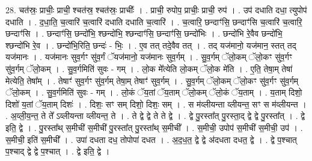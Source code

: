 \documentclass[17pt]{extarticle}
\begin{document}
28. चत॑स्रः॒ प्राचीः॒ प्राची॒ श्चत॑स्र॒ श्चत॑स्रः॒ प्राचीः᳚ । . प्राची॒ रुपोप॒ प्राचीः॒ प्राची॒ रुप॑ । . उप॑ दधाति दधा॒ त्युपोप॑ दधाति । . द॒धा॒ति॒ च॒त्वारि॑ च॒त्वारि॑ दधाति दधाति च॒त्वारि॑ । . च॒त्वारि॒ छन्दाꣳ॑सि॒ छन्दाꣳ॑सि च॒त्वारि॑ च॒त्वारि॒ छन्दाꣳ॑सि । . छन्दाꣳ॑सि॒ छन्दो॑भि॒ श्छन्दो॑भि॒ श्छन्दाꣳ॑सि॒ छन्दाꣳ॑सि॒ छन्दो॑भिः । . छन्दो॑भि रे॒वैव छन्दो॑भि॒ श्छन्दो॑भि रे॒व । . छन्दो॑भि॒रिति॒ छन्दः॑ - भिः॒ । . ए॒व तत् तदे॒वैव तत् । . तद् यज॑मानो॒ यज॑मान॒ स्तत् तद् यज॑मानः । . यज॑मानः सुव॒र्गꣳ सु॑व॒र्गं ॅयज॑मानो॒ यज॑मानः सुव॒र्गम् । . सु॒व॒र्गम् ॅलो॒कम् ॅलो॒कꣳ सु॑व॒र्गꣳ सु॑व॒र्गम् ॅलो॒कम् । . सु॒व॒र्गमिति॑ सुवः - गम् । . लो॒क मे᳚त्येति लो॒कम् ॅलो॒क मे॑ति । . ए॒ति॒ तेषा॒म् तेषा॑ मेत्येति॒ तेषा᳚म् । . तेषाꣳ॑ सुव॒र्गꣳ सु॑व॒र्गम् तेषा॒म् तेषाꣳ॑ सुव॒र्गम् । . सु॒व॒र्गम् ॅलो॒कम् ॅलो॒कꣳ सु॑व॒र्गꣳ सु॑व॒र्गम् ॅलो॒कम् । . सु॒व॒र्गमिति॑ सुवः - गम् । . लो॒कं ॅय॒तां ॅय॒ताम् ॅलो॒कम् ॅलो॒कं ॅय॒ताम् । . य॒ताम् दिशो॒ दिशो॑ य॒तां ॅय॒ताम् दिशः॑ । . दिशः॒ सꣳ सम् दिशो॒ दिशः॒ सम् । . स म॑व्लीयन्ता व्लीयन्त॒ सꣳ स म॑व्लीयन्त । . अ॒व्ली॒य॒न्त॒ ते ते᳚ ऽव्लीयन्ता व्लीयन्त॒ ते । . ते द्वे द्वे ते ते द्वे । . द्वे पु॒रस्ता᳚त् पु॒रस्ता॒द् द्वे द्वे पु॒रस्ता᳚त् । . द्वे इति॒ द्वे । . पु॒रस्ता᳚थ् स॒मीची॑ स॒मीची॑ पु॒रस्ता᳚त् पु॒रस्ता᳚थ् स॒मीची᳚ । . स॒मीची॒ उपोप॑ स॒मीची॑ स॒मीची॒ उप॑ । . स॒मीची॒ इति॑ स॒मीची᳚ । . उपा॑ दधता दध॒ तोपोपा॑ दधत । . अ॒द॒ध॒त॒ द्वे द्वे अ॑दधता दधत॒ द्वे । . द्वे प॒श्चात् प॒श्चाद् द्वे द्वे प॒श्चात् । . द्वे इति॒ द्वे । \newline
\end{document}
